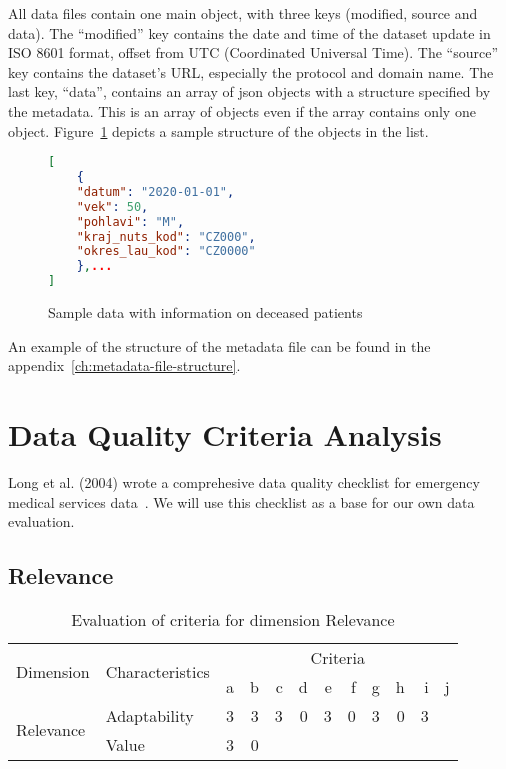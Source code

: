 All data files contain one main object, with three keys (modified, source and data).
The \enquote{modified} key contains the date and time of the dataset update in ISO 8601 format, offset from UTC (Coordinated Universal Time).
The \enquote{source} key contains the dataset's URL, especially the protocol and domain name.
The last key, \enquote{data}, contains an array of json objects with a structure specified by the metadata.
This is an array of objects even if the array contains only one object.
Figure~\ref{ls:sample-data-deceased} depicts a sample structure of the objects in the list.

\begin{figure}[htb]
    \centering

    \begin{lstlisting}[language=json,firstnumber=1]
[
    {
    "datum": "2020-01-01",
    "vek": 50,
    "pohlavi": "M",
    "kraj_nuts_kod": "CZ000",
    "okres_lau_kod": "CZ0000"
    },...
]
    \end{lstlisting}

    \caption{Sample data with information on deceased patients}
    \label{ls:sample-data-deceased}
\end{figure}
\FloatBarrier

An example of the structure of the metadata file can be found in the appendix~\ref{ch:metadata-file-structure}.

\section{Data Quality Criteria Analysis}

Long et al. (2004) wrote a comprehesive data quality checklist for emergency medical services data~\cite{long2004}.
We will use this checklist as a base for our own data evaluation.

\subsection{Relevance}

\begin{table}[htbp]
    \centering

    \begin{tabular}{llrrrrrrrrrr}
        \toprule
        \multirow{2}{*}{Dimension}  & \multirow{2}{*}{Characteristics}  & \multicolumn{10}{c}{Criteria}         \\ \cmidrule(lr){3-12}
                                    &                                   & a & b & c & d & e & f & g & h & i & j \\ \midrule
        \multirow{2}{*}{Relevance}  & Adaptability                      & 3 & 3 & 3 & 0 & 3 & 0 & 3 & 0 & 3 &   \\
                                    & Value                             & 3 & 0 &   &   &   &   &   &   &   &   \\
        \bottomrule
    \end{tabular}

    \caption{Evaluation of criteria for dimension Relevance}
    \label{table:relevance-benchmark}
\end{table}
\FloatBarrier

